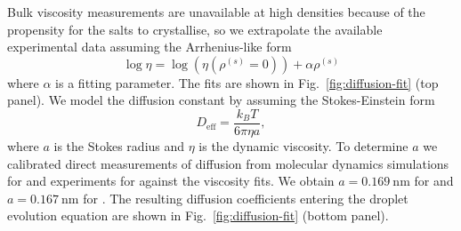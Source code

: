 \documentclass[11pt,twoside]{report}
\begin{document}
Bulk viscosity measurements are unavailable at high densities because of the propensity for the salts to crystallise, so we extrapolate the available experimental data \cite{PowerCS2013}  assuming the Arrhenius-like form
\begin{equation}\label{eq:vft-fit}
  \log{\eta}
  =
  \log{\left(\eta(\rho^{(s)} = 0)\right)}
  + \alpha \rho^{(s)}
\end{equation}
where $\alpha$ is a fitting parameter.
The fits are shown in Fig.\ \ref{fig:diffusion-fit} (top panel).
We model the diffusion constant by assuming the Stokes-Einstein form
\begin{equation}\label{eq:stokes-einstein}
  D_\mathrm{eff} = \frac{k_B T}{6 \pi \eta a},
\end{equation}
where $a$ is the Stokes radius and $\eta$ is the dynamic viscosity.
To determine $a$ we calibrated direct measurements of diffusion from molecular dynamics simulations for \cite{LyubartsevJPC1996} and experiments for \cite{YehJCED1970} against the viscosity fits.
We obtain $a=\SI{0.169}{\nano\metre}$ for  and $a=\SI{0.167}{\nano\metre}$ for .
The resulting diffusion coefficients entering the droplet evolution equation are shown in Fig.\ \ref{fig:diffusion-fit} (bottom panel).
\end{document}
